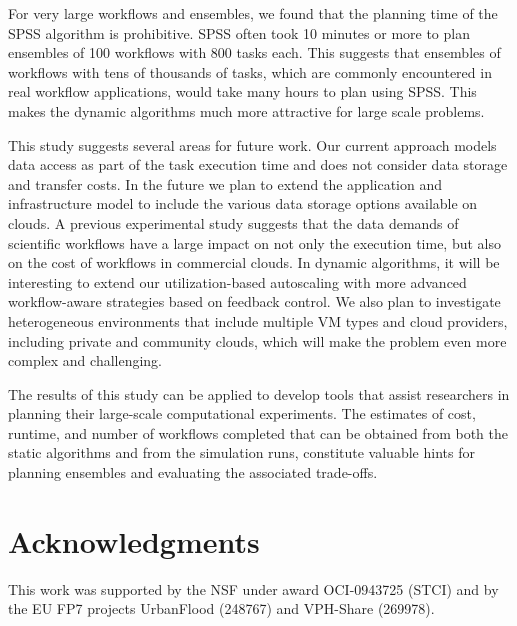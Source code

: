 \documentclass[conference]{IEEEtran}
\begin{document}
For very large workflows and ensembles, we found that the planning time of
the SPSS algorithm is prohibitive. SPSS often took 10 minutes or more to plan
ensembles of 100 workflows with 800 tasks each. This suggests that ensembles
of workflows with tens of thousands of tasks, which are commonly encountered
in real workflow applications, would take many hours to plan using SPSS. This
makes the dynamic algorithms much more attractive for large scale problems.

This study suggests several areas for future work. Our current approach models
data access as part of the task execution time and does not consider data
storage and transfer costs. In the future we plan to extend the application
and infrastructure model to  include the various data storage options
available on clouds. A previous experimental study \cite{Juve2010} suggests
that the data demands of scientific workflows have a large impact on not only
the execution time, but also on the cost of workflows in commercial clouds. 
In dynamic algorithms, it will be interesting to extend our
utilization-based autoscaling with more advanced workflow-aware strategies
based on feedback control.
We also plan to investigate heterogeneous environments that include multiple VM
types and cloud providers, including private and community clouds, which will
make the problem even more complex and challenging.


The results of this study can be applied to develop tools that assist
researchers in planning their large-scale computational experiments. The
estimates of cost, runtime, and number of workflows completed that can be
obtained from both the static algorithms and from the simulation runs,
constitute valuable hints for planning ensembles and evaluating the
associated trade-offs.


\section*{Acknowledgments}
This work was supported by the NSF under award OCI-0943725 (STCI) and
by the EU FP7 projects UrbanFlood (248767) and VPH-Share (269978).

%







\end{document}
